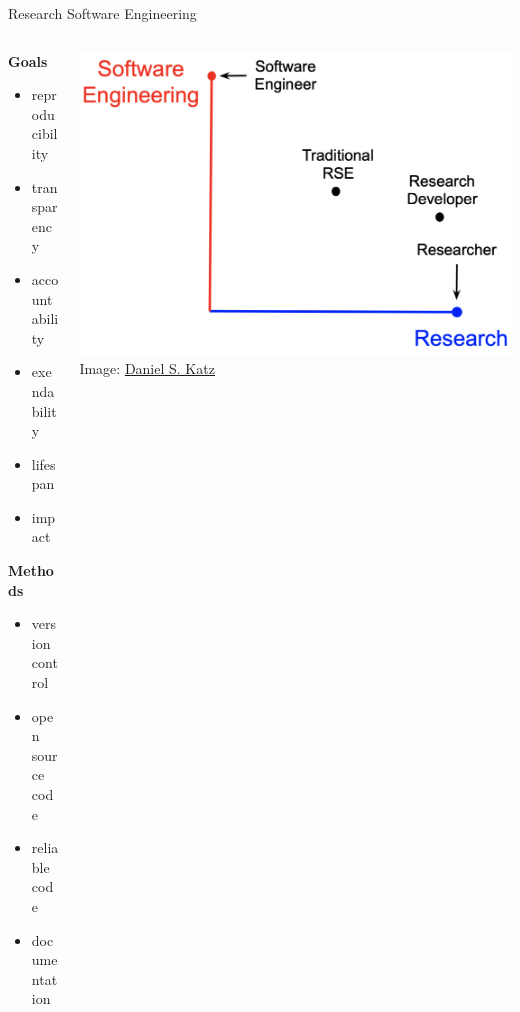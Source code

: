 \documentclass{beamer} %
\begin{document}
  \begin{frame}{Research Software Engineering}
    \begin{columns}
      \begin{column}{0.4\textwidth}
        \textbf{Goals}
        \begin{itemize}
          \item reproducibility
          \item transparency
          \item accountability
          \item exendability
          \item lifespan
          \item impact
        \end{itemize}
        
        \textbf{Methods}
        \begin{itemize}
          \item version control
          \item open source code
          \item reliable code
          \item documentation
        \end{itemize}
      \end{column}

      \begin{column}{0.6\textwidth}
        \includegraphics[width=\textwidth]{RSE_graph_katz.png}
        \tiny{Image: \href{https://danielskatzblog.wordpress.com/2019/07/12/super-rses-combining-research-and-service-in-three-dimensions-of-research-software-engineering/}{\underline{Daniel S. Katz}}}
      \end{column}
  \end{columns}
  \end{frame}
\end{document}

